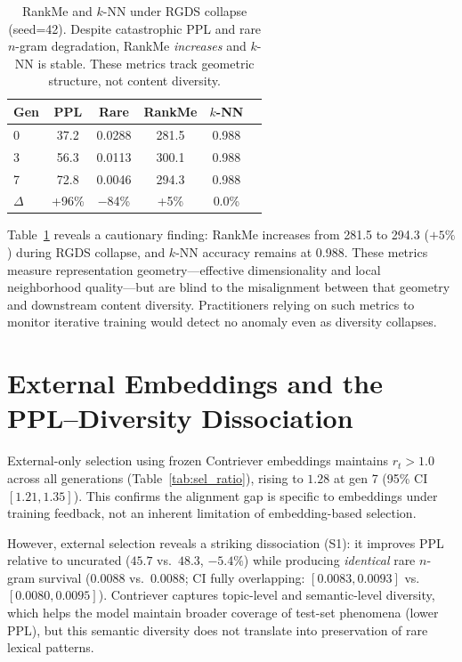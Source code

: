 \documentclass[11pt,a4paper]{article}
\begin{document}
\begin{table}[t]
\centering
\small
\begin{tabular}{lccccc}
\toprule
\textbf{Gen} & \textbf{PPL} & \textbf{Rare} & \textbf{RankMe} & \textbf{$k$-NN} \\
\midrule
0 & 37.2 & 0.0288 & 281.5 & 0.988 \\
3 & 56.3 & 0.0113 & 300.1 & 0.988 \\
7 & 72.8 & 0.0046 & 294.3 & 0.988 \\
\midrule
$\Delta$ & +96\% & $-$84\% & +5\% & 0.0\% \\
\bottomrule
\end{tabular}
\caption{RankMe and $k$-NN under RGDS collapse (seed=42). Despite catastrophic PPL and rare $n$-gram degradation, RankMe \emph{increases} and $k$-NN is stable. These metrics track geometric structure, not content diversity.}
\label{tab:metrics_blind}
\end{table}

Table~\ref{tab:metrics_blind} reveals a cautionary finding: RankMe increases from 281.5 to 294.3 ($+5\%$) during RGDS collapse, and $k$-NN accuracy remains at 0.988.
These metrics measure representation geometry---effective dimensionality and local neighborhood quality---but are blind to the misalignment between that geometry and downstream content diversity.
Practitioners relying on such metrics to monitor iterative training would detect no anomaly even as diversity collapses.

\section{External Embeddings and the PPL--Diversity Dissociation}
\label{sec:external}

External-only selection using frozen Contriever embeddings maintains $r_t > 1.0$ across all generations (Table~\ref{tab:sel_ratio}), rising to $1.28$ at gen 7 (95\% CI $[1.21, 1.35]$).
This confirms the alignment gap is specific to embeddings under training feedback, not an inherent limitation of embedding-based selection.

However, external selection reveals a striking dissociation (S1): it improves PPL relative to uncurated ($45.7$ vs.\ $48.3$, $-5.4\%$) while producing \emph{identical} rare $n$-gram survival ($0.0088$ vs.\ $0.0088$; CI fully overlapping: $[0.0083, 0.0093]$ vs.\ $[0.0080, 0.0095]$).
Contriever captures topic-level and semantic-level diversity, which helps the model maintain broader coverage of test-set phenomena (lower PPL), but this semantic diversity does not translate into preservation of rare lexical patterns.
\end{document}
